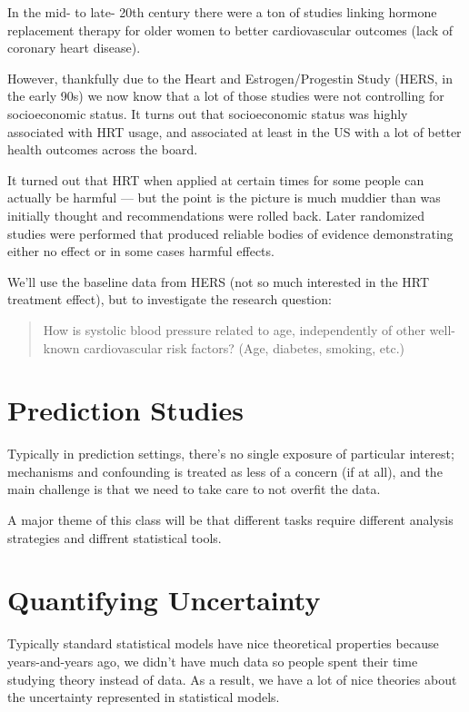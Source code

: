 \documentclass[
  letterpaper,
  DIV=11,
  numbers=noendperiod]{scrreport}
\begin{document}
In the mid- to late- 20th century there were a ton of studies linking
hormone replacement therapy for older women to better cardiovascular
outcomes (lack of coronary heart disease).

However, thankfully due to the Heart and Estrogen/Progestin Study (HERS,
in the early 90s) we now know that a lot of those studies were not
controlling for socioeconomic status. It turns out that socioeconomic
status was highly associated with HRT usage, and associated at least in
the US with a lot of better health outcomes across the board.

It turned out that HRT when applied at certain times for some people can
actually be harmful --- but the point is the picture is much muddier
than was initially thought and recommendations were rolled back. Later
randomized studies were performed that produced reliable bodies of
evidence demonstrating either no effect or in some cases harmful
effects.

We'll use the baseline data from HERS (not so much interested in the HRT
treatment effect), but to investigate the research question:

\begin{quote}
How is systolic blood pressure related to age, independently of other
well-known cardiovascular risk factors? (Age, diabetes, smoking, etc.)
\end{quote}

\hypertarget{prediction-studies}{%
\section{Prediction Studies}\label{prediction-studies}}

Typically in prediction settings, there's no single exposure of
particular interest; mechanisms and confounding is treated as less of a
concern (if at all), and the main challenge is that we need to take care
to not {overfit} the data.

A major theme of this class will be that different tasks require
different analysis strategies and diffrent statistical tools.

\hypertarget{quantifying-uncertainty}{%
\section{Quantifying Uncertainty}\label{quantifying-uncertainty}}

Typically standard statistical models have nice theoretical properties
because years-and-years ago, we didn't have much data so people spent
their time studying theory instead of data. As a result, we have a lot
of nice theories about the uncertainty represented in statistical
models.
\end{document}

